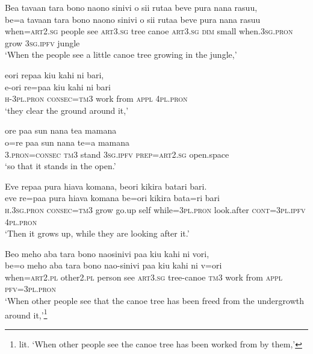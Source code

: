 \ea\label{ex:text3-5}
Bea tavaan tara bono naono sinivi o sii rutaa beve pura nana rasuu,\\
\gll be=a	tavaan	tara	bono	naono	sinivi	o	sii	rutaa	beve	pura	nana	rasuu\\
     when=\textsc{art}2.\textsc{sg}	people	see	\textsc{art}3.\textsc{sg}	tree	canoe	\textsc{art}3.\textsc{sg}	\textsc{dim}	small	when.3\textsc{sg}.\textsc{pron}	grow	3\textsc{sg}.\textsc{ipfv}	jungle\\
\glt `When the people see a little canoe tree growing in the jungle,'
\z

\ea\label{ex:text3-6}
eori repaa kiu kahi ni bari,\\
\gll e-ori	re=paa	kiu	kahi	ni	bari\\
     \textsc{h}-3\textsc{pl}.\textsc{pron}	\textsc{consec}=\textsc{tm}3	work	from	\textsc{appl}	4\textsc{pl}.\textsc{pron}\\
\glt `they clear the ground around it,'
\z

\ea\label{ex:text3-7}
ore paa sun nana tea mamana\\
\gll o=re	paa	sun	nana	te=a	mamana\\
     3.\textsc{pron}=\textsc{consec}	\textsc{tm}3	stand	3\textsc{sg}.\textsc{ipfv}	\textsc{prep}=\textsc{art}2.\textsc{sg}	open.space\\
\glt `so that it stands in the open.'
\z

\ea\label{ex:text3-8}
Eve repaa pura hiava komana, beori kikira batari bari.\\
\gll eve	re=paa	pura	hiava	komana	be=ori	kikira	bata=ri	bari\\
     \textsc{h}.3\textsc{sg}.\textsc{pron}	\textsc{consec}=\textsc{tm}3	grow	go.up	self	while=3\textsc{pl}.\textsc{pron}	look.after	\textsc{cont}=3\textsc{pl}.\textsc{ipfv}	4\textsc{pl}.\textsc{pron}\\
\glt `Then it grows up, while they are looking after it.'
\z

\ea\label{ex:text3-9}
Beo meho aba tara bono naosinivi paa kiu kahi ni vori,\\
\gll be=o	meho	aba	tara	bono	nao-sinivi	paa	kiu	kahi	ni	v=ori\\
     when=\textsc{art}2.\textsc{pl}	other2.\textsc{pl}	person	see	\textsc{art}3.\textsc{sg}	tree-canoe	\textsc{tm}3	work	from	\textsc{appl}	\textsc{pfv}=3\textsc{pl}.\textsc{pron}\\
\glt `When other people see that the canoe tree has been freed from the undergrowth around it,'\footnote{lit. `When other people see the canoe tree has been worked from by them,'}
\z

